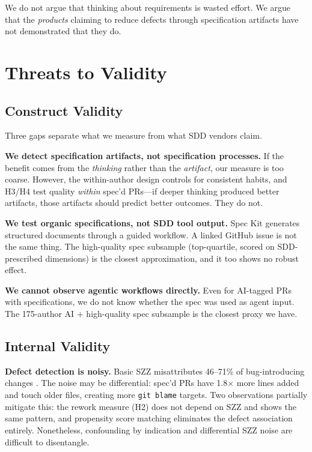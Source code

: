 \documentclass[a4paper,UKenglish,cleveref,autoref,thm-restate]{lipics-v2021}
\begin{document}
We do not argue that thinking about requirements is wasted effort. We argue that the \emph{products} claiming to reduce defects through specification artifacts have not demonstrated that they do.

\section{Threats to Validity}

\subsection{Construct Validity}

Three gaps separate what we measure from what SDD vendors claim.

\textbf{We detect specification artifacts, not specification processes.} If the benefit comes from the \emph{thinking} rather than the \emph{artifact}, our measure is too coarse. However, the within-author design controls for consistent habits, and H3/H4 test quality \emph{within} spec'd PRs---if deeper thinking produced better artifacts, those artifacts should predict better outcomes. They do not.

\textbf{We test organic specifications, not SDD tool output.} Spec Kit generates structured documents through a guided workflow. A linked GitHub issue is not the same thing. The high-quality spec subsample (top-quartile, scored on SDD-prescribed dimensions) is the closest approximation, and it too shows no robust effect.

\textbf{We cannot observe agentic workflows directly.} Even for AI-tagged PRs with specifications, we do not know whether the spec was used as agent input. The 175-author AI + high-quality spec subsample is the closest proxy we have.

\subsection{Internal Validity}

\textbf{Defect detection is noisy.} Basic SZZ misattributes 46--71\% of bug-introducing changes \cite{dacosta2017}. The noise may be differential: spec'd PRs have 1.8$\times$ more lines added and touch older files, creating more \texttt{git blame} targets. Two observations partially mitigate this: the rework measure (H2) does not depend on SZZ and shows the same pattern, and propensity score matching eliminates the defect association entirely. Nonetheless, confounding by indication and differential SZZ noise are difficult to disentangle.
\end{document}
